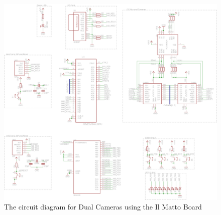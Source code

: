 \begin{figure}[ht!]
\centering
\includegraphics[angle = 90, width=\textwidth,height=\textheight,keepaspectratio]{Figures/IlMattoCamera_CircuitDiagram.png} 
\caption{The circuit diagram for Dual Cameras using the Il Matto Board}
\label{sch:DualCam_Schematic}

\end{figure}